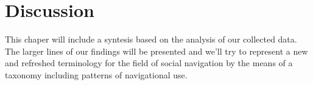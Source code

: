 \chapter{Discussion}
\label{chapter:discussion}

This chaper will include a syntesis based on the analysis of our collected
data. The larger lines of our findings will be presented and we'll try to
represent a new and refreshed terminology for the field of social navigation
by the means of a taxonomy including patterns of navigational use.
